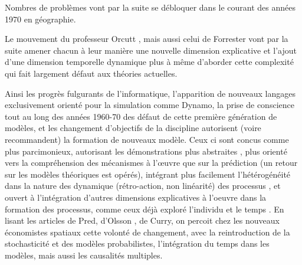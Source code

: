 Nombres de problèmes vont par la suite se débloquer dans le courant des années 1970 en géographie.


Le mouvement du professeur Orcutt \autocite{Orcutt1957}, mais aussi celui de Forrester \autocite{Forrester1961, Forrester1969} vont par la suite amener chacun à leur manière une nouvelle dimension explicative et l'ajout d'une dimension temporelle dynamique plus à même d'aborder cette complexité qui fait largement défaut aux théories actuelles. \autocite[p295]{Batty1976}

Ainsi les progrès fulgurants de l'informatique, l'apparition de nouveaux langages exclusivement orienté pour la simulation comme Dynamo, la prise de conscience tout au long des années 1960-70 des défaut de cette première génération de modèles, et les changement d'objectifs de la discipline \autocite[12]{Batty1994} \autocite{Boyce1988} autorisent (voire recommandent) la formation de nouveaux modèle. Ceux ci sont concus comme plus parcimonieux, autorisant les démonstrations plus abstraites \autocite{Forrester1969}, plus orienté vers la compréhension des mécanismes à l’œuvre que sur la prédiction (un retour sur les modèles théoriques est opérés), intégrant plus facilement l'hétérogénéité dans la nature des dynamique (rétro-action, non linéarité) des processus \autocite{Forrester1969, Wilson1970, Allen1978}, et ouvert à l'intégration d'autres dimensions explicatives à l'oeuvre dans la formation des processus, comme ceux déjà exploré l'individu et le temps \autocite{Hagerstrand1967a,Orcutt1957,Forrester1961}. En lisant les articles de Pred, d'Olsson \autocite{Olsson1969,Olsson1970}, de Curry, on percoit chez les nouveaux économistes spatiaux cette volonté de changement, avec la reintroduction de la stochasticité et des modèles probabilistes, l'intégration du temps dans les modèles, mais aussi les causalités multiples.


